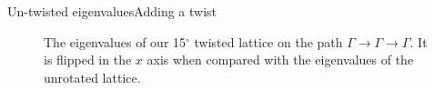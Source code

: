 \documentclass[9pt]{beamer}
\begin{document}
\begin{frame}{Un-twisted eigenvalues}{Adding a twist}
  \begin{figure}
  \centering
    \caption{The eigenvalues of our 15$^\circ$ twisted lattice on the path $\Gamma \rightarrow \Gamma \rightarrow \Gamma$. It is flipped in the $x$ axis when compared with the eigenvalues of the unrotated lattice.}
  \end{figure}
\end{frame}
\end{document}
